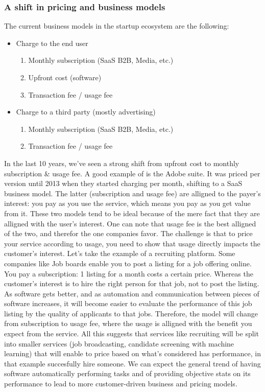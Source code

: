 \documentclass[12pt]{article}
\begin{document}
\subsubsection{A shift in pricing and business models}
The current business models in the startup ecosystem are the following:
\begin{itemize}
  \item Charge to the end user
  \begin{enumerate}
    \item Monthly subscription (SaaS B2B, Media, etc.)
    \item Upfront cost (software)
    \item Transaction fee / usage fee
  \end{enumerate}
  \item Charge to a third party (mostly advertising)
  \begin{enumerate}
    \item Monthly subscription (SaaS B2B, Media, etc.)
    \item Transaction fee / usage fee
  \end{enumerate}
\end{itemize}

In the last 10 years, we've seen a strong shift from upfront cost to monthly subscription & usage fee. A good example of is the Adobe suite. It was priced per version until 2013 when they started charging per month, shifting to a SaaS business model.
The latter (subscription and usage fee) are alligned to the payer's interest: you pay as you use the service, which means you pay as you get value from it. These two models tend to be ideal because of the mere fact that they are alligned with the user's interest. One can note that usage fee is the best alligned of the two, and therefor the one companies favor.
The challenge is that to price your service according to usage, you need to show that usage directly impacts the customer's interest. Let's take the example of a recruiting platform. Some companies like Job boards enable you to post a listing for a job offering online. You pay a subscription: 1 listing for a month costs a certain price. Whereas the customer's interest is to hire the right person for that job, not to post the listing. As software gets better, and as automation and communication between pieces of software increases, it will become easier to evaluate the performance of this job listing by the quality of applicants to that jobs. Therefore, the model will change from subscription to usage fee, where the usage is alligned with the benefit you expect from the service.
All this suggests that services like recruiting will be split into smaller services (job broadcasting, candidate screening with machine learning) that will enable to price based on what's considered has performance, in that example succesfully hire someone. We can expect the general trend of having software automatically performing tasks and of providing objective stats on its performance to lead to more customer-driven business and pricing models.
\end{document}

